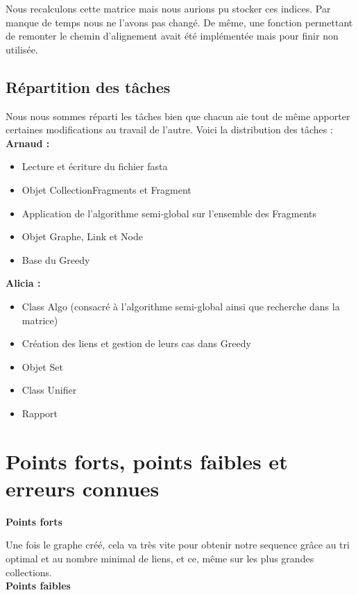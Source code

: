 \documentclass{article}
\begin{document}
Nous recalculons cette matrice mais nous aurions pu stocker ces indices. Par manque de temps nous ne l'avons pas changé. De même, une fonction permettant de remonter le chemin d'alignement avait été implémentée mais pour finir non utilisée.


\subsection{Répartition des tâches}
Nous nous sommes réparti les tâches bien que chacun aie tout de même apporter certaines modifications au travail de l'autre. Voici la distribution des tâches :\\

\textbf{Arnaud :}
\begin{itemize}
\item Lecture et écriture du fichier fasta
\item Objet CollectionFragments et Fragment
\item Application de l'algorithme semi-global sur l'ensemble des Fragments
\item Objet Graphe, Link et Node
\item Base du Greedy
\end{itemize}

\vspace{1.5mm}
\textbf{Alicia :}
\begin{itemize}
\item Class Algo (consacré à l'algorithme semi-global ainsi que recherche dans la matrice)
\item Création des liens et gestion de leurs cas dans Greedy
\item Objet Set
\item Class Unifier
\item Rapport
\end{itemize}
\section{Points forts, points faibles et erreurs connues}
\textbf{Points forts}
\vspace{1.5mm}

Une fois le graphe créé, cela va très vite pour obtenir notre sequence grâce au tri optimal et au nombre minimal de liens, et ce, même sur les plus grandes collections.\\



\textbf{Points faibles}
\vspace{1.5mm}
\end{document}
